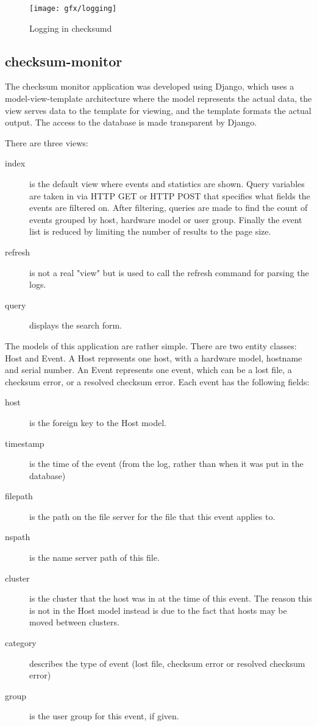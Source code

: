 \begin{figure}[ht]
\centering
\texttt{[image: gfx/logging]}
\caption{Logging in checksumd}
\label{fig:logging}
\end{figure}

\subsection{checksum-monitor}
The checksum monitor application was developed using Django, which uses a model-view-template architecture where the model represents the actual data, the view serves data to the template for viewing, and the template formats the actual output. The access to the database is made transparent by Django. 

There are three views:
\begin{description}
\item[index] is the default view where events and statistics are shown. Query variables are taken in via HTTP GET or HTTP POST that specifies what fields the events are filtered on. After filtering, queries are made to find the count of events grouped by host, hardware model or user group. Finally the event list is reduced by limiting the number of results to the page size.
\item[refresh] is not a real "view" but is used to call the refresh command for parsing the logs.
\item[query] displays the search form.
\end{description} 

The models of this application are rather simple. There are two entity classes: Host and Event. A Host represents one host, with a hardware model, hostname and serial number. An Event represents one event, which can be a lost file, a checksum error, or a resolved checksum error. Each event has the following fields:
\begin{description}
\item[host] is the foreign key to the Host model.
\item[timestamp] is the time of the event (from the log, rather than when it was put in the database)
\item[filepath] is the path on the file server for the file that this event applies to.
\item[nspath] is the name server path of this file.
\item[cluster] is the cluster that the host was in at the time of this event. The reason this is not in the Host model instead is due to the fact that hosts may be moved between clusters.
\item[category] describes the type of event (lost file, checksum error or resolved checksum error)
\item[group] is the user group for this event, if given.
\end{description}

